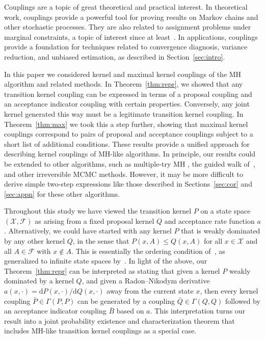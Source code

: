 \documentclass[aihp]{imsart}
\theoremstyle{plain}
\theoremstyle{remark}
\theoremstyle{definition} \newtheorem{example}{Example}
\newcommand{\scrF}{\mathscr{F}}
\newcommand{\calX}{\mathcal{X}}
\newcommand{\diff}{\mathrm{d} } %
\newcommand{\bp}{\bar P}
\newcommand{\bq}{\bar Q}
\newcommand{\bb}{\bar B}
\begin{document}
Couplings are a topic of great theoretical and practical interest. In theoretical work, couplings
provide a powerful tool for proving results on Markov chains and other stochastic processes. They
are also related to assignment problems under marginal constraints, a topic of interest since at
least~\citet{birkhoff1946three}. In applications, couplings provide a foundation for techniques
related to convergence diagnosis, variance reduction, and unbiased estimation, as described in
Section~\ref{sec:intro}.

In this paper we considered kernel and maximal kernel couplings of the MH algorithm and related
methods. In Theorem~\ref{thm:repr}, we showed that any transition kernel coupling can be expressed
in terms of a proposal coupling and an acceptance indicator coupling with certain properties.
Conversely, any joint kernel generated this way must be a legitimate transition kernel coupling. In
Theorem~\ref{thm:max} we took this a step further, showing that maximal kernel couplings correspond
to pairs of proposal and acceptance couplings subject to a short list of additional conditions.
These results provide a unified approach for describing kernel couplings of MH-like algorithms. In
principle, our results could be extended to other algorithms, such as multiple-try MH
\citep{liu2000multiple}, the guided walk of~\citet{gustafson1998guided}, and other irreversible MCMC
methods. However, it may be more difficult to derive simple two-step expressions like those
described in Sections~\ref{sec:cor} and \ref{sec:appn} for these other algorithms.

Throughout this study we have viewed the transition kernel $P$ on a state space $(\calX, \scrF)$ as
arising from a fixed proposal kernel $Q$ and acceptance rate function $a$. Alternatively, we could
have started with any kernel $P$ that is weakly dominated by any other kernel $Q$, in the sense that
$P(x, A) \leq Q(x, A)$ for all $x \in \calX$ and all $A \in \scrF$ with $x \not \in A$. This is
essentially the ordering condition of~\citet{peskun1973optimum}, as generalized to infinite state
spaces by~\citet{tierney1998note}. In light of the above, our Theorem~\ref{thm:repr} can be
interpreted as stating that given a kernel $P$ weakly dominated by a kernel $Q$, and given a
Radon--Nikodym derivative $a(x, \cdot) = \diff P(x, \cdot) / \diff Q(x, \cdot)$ away from the
current state $x$, then every kernel coupling ${\bp \in \Gamma(P, P)}$ can be generated by a
coupling $\bq \in \Gamma(Q, Q)$ followed by an acceptance indicator coupling $\bb$ based on $a$.
This interpretation turns our result into a joint probability existence and characterization theorem
that includes MH-like transition kernel couplings as a special case.
\end{document}
